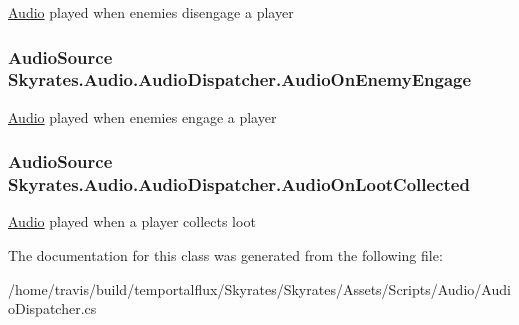 \hyperlink{namespace_skyrates_1_1_audio}{Audio} played when enemies disengage a player 

\hypertarget{class_skyrates_1_1_audio_1_1_audio_dispatcher_ac81a741598771dc6e765d74df26d3abc}{
\subsubsection[{Audio\-On\-Enemy\-Engage}]{\setlength{\rightskip}{0pt plus 5cm}Audio\-Source Skyrates.\-Audio.\-Audio\-Dispatcher.\-Audio\-On\-Enemy\-Engage}}\label{class_skyrates_1_1_audio_1_1_audio_dispatcher_ac81a741598771dc6e765d74df26d3abc}


\hyperlink{namespace_skyrates_1_1_audio}{Audio} played when enemies engage a player 

\hypertarget{class_skyrates_1_1_audio_1_1_audio_dispatcher_a17aa664c4fd2364854b960dbb87d6f9c}{
\subsubsection[{Audio\-On\-Loot\-Collected}]{\setlength{\rightskip}{0pt plus 5cm}Audio\-Source Skyrates.\-Audio.\-Audio\-Dispatcher.\-Audio\-On\-Loot\-Collected}}\label{class_skyrates_1_1_audio_1_1_audio_dispatcher_a17aa664c4fd2364854b960dbb87d6f9c}


\hyperlink{namespace_skyrates_1_1_audio}{Audio} played when a player collects loot 



The documentation for this class was generated from the following file\-:\begin{DoxyCompactItemize}
\item 
/home/travis/build/temportalflux/\-Skyrates/\-Skyrates/\-Assets/\-Scripts/\-Audio/Audio\-Dispatcher.\-cs\end{DoxyCompactItemize}
